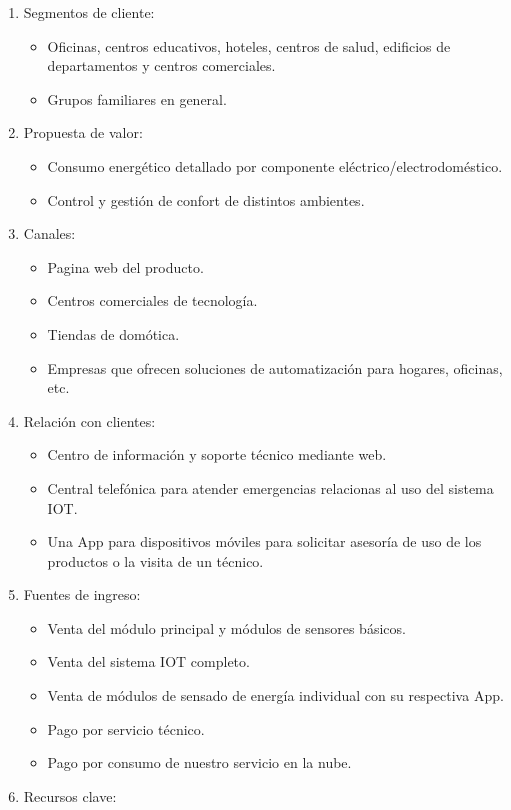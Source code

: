 \documentclass[11pt]{charter}
\begin{document}
\begin{enumerate}
\item Segmentos de cliente:
\begin{itemize}
\item Oficinas, centros educativos, hoteles, centros de salud, edificios de departamentos y centros comerciales.  
\item Grupos familiares en general.
\end{itemize}
\item Propuesta de valor:
\begin{itemize}
\item Consumo energético detallado por componente eléctrico/electrodoméstico.
\item Control y gestión de confort de distintos ambientes.
\end{itemize}
\item Canales:
   \begin{itemize}
\item Pagina web del producto.
\item Centros comerciales de tecnología.
\item Tiendas de domótica.
\item Empresas que ofrecen soluciones de automatización para hogares, oficinas, etc.
\end{itemize}
\item Relación con clientes:
\begin{itemize}
\item Centro de información y soporte técnico mediante web.
\item Central telefónica para atender emergencias relacionas al uso del sistema IOT.
\item Una App para dispositivos móviles para solicitar asesoría de uso de los productos o la visita de un técnico. 
\end{itemize}
\item Fuentes de ingreso:
\begin{itemize}
\item Venta del módulo principal y módulos de sensores básicos.
\item Venta del sistema IOT completo.
\item Venta de módulos de sensado de energía individual con su respectiva App.
\item Pago por servicio técnico.
\item Pago por consumo de nuestro servicio en la nube.
\end{itemize}
\item Recursos clave:

\end{enumerate}
\end{document}
